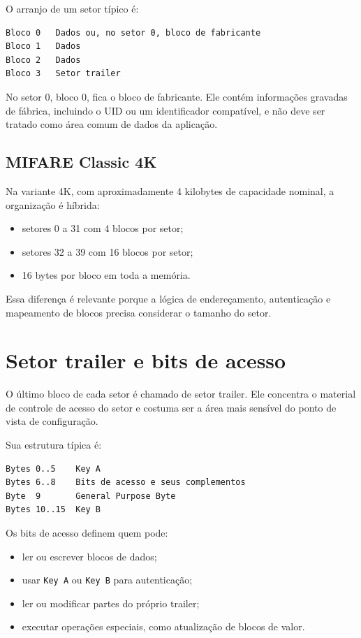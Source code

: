 O arranjo de um setor típico é:
\begin{verbatim}
Bloco 0   Dados ou, no setor 0, bloco de fabricante
Bloco 1   Dados
Bloco 2   Dados
Bloco 3   Setor trailer
\end{verbatim}

No setor 0, bloco 0, fica o bloco de fabricante. Ele contém informações gravadas de fábrica, incluindo o UID ou um identificador compatível, e não deve ser tratado como área comum de dados da aplicação.

\subsection{MIFARE Classic 4K}
Na variante 4K, com aproximadamente 4 kilobytes de capacidade nominal, a organização é híbrida:
\begin{itemize}[leftmargin=*]
  \item setores 0 a 31 com 4 blocos por setor;
  \item setores 32 a 39 com 16 blocos por setor;
  \item 16 bytes por bloco em toda a memória.
\end{itemize}

Essa diferença é relevante porque a lógica de endereçamento, autenticação e mapeamento de blocos precisa considerar o tamanho do setor.

\section{Setor trailer e bits de acesso}
O último bloco de cada setor é chamado de setor trailer. Ele concentra o material de controle de acesso do setor e costuma ser a área mais sensível do ponto de vista de configuração.

Sua estrutura típica é:
\begin{verbatim}
Bytes 0..5    Key A
Bytes 6..8    Bits de acesso e seus complementos
Byte  9       General Purpose Byte
Bytes 10..15  Key B
\end{verbatim}

Os bits de acesso definem quem pode:
\begin{itemize}[leftmargin=*]
  \item ler ou escrever blocos de dados;
  \item usar \texttt{Key A} ou \texttt{Key B} para autenticação;
  \item ler ou modificar partes do próprio trailer;
  \item executar operações especiais, como atualização de blocos de valor.
\end{itemize}


